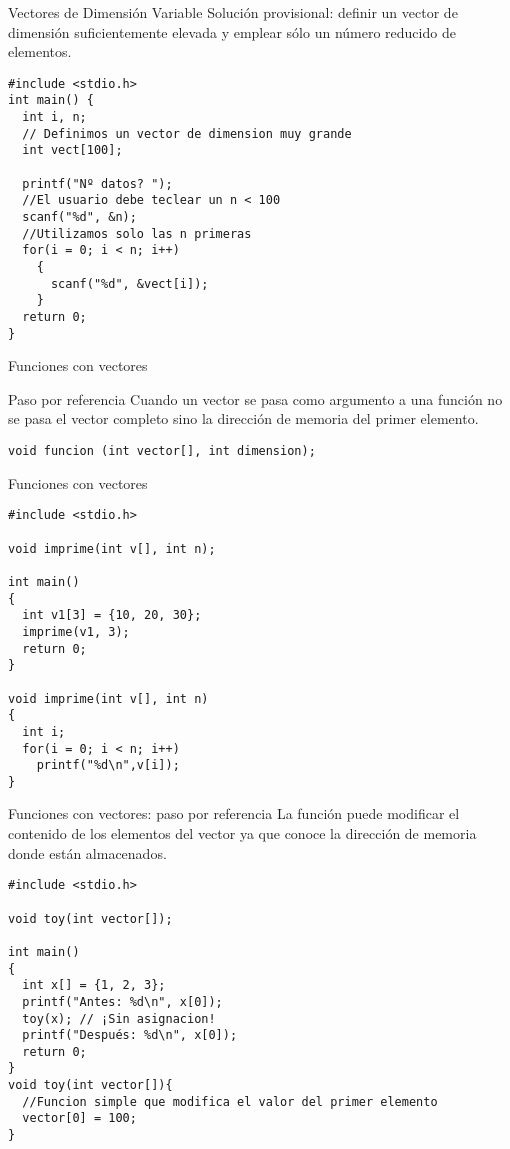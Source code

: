 \documentclass[xcolor={usenames,svgnames,dvipsnames}, aspectratio=169]{beamer}
\begin{document}
\begin{frame}[label={sec:orgffeb8ed},fragile]{Vectores de Dimensión Variable}
 \alert{Solución provisional}: definir un vector de dimensión suficientemente elevada y emplear sólo un número reducido de elementos.
\lstset{language=C,label= ,caption= ,captionpos=b,numbers=none}
\begin{lstlisting}
#include <stdio.h>
int main() {
  int i, n;
  // Definimos un vector de dimension muy grande
  int vect[100];

  printf("Nº datos? ");
  //El usuario debe teclear un n < 100
  scanf("%d", &n); 
  //Utilizamos solo las n primeras
  for(i = 0; i < n; i++) 
    {
      scanf("%d", &vect[i]);
    }
  return 0;
}
\end{lstlisting}
\end{frame}
\begin{frame}[label={sec:orgbdd855d},fragile]{Funciones con vectores}
 \begin{block}{Paso por referencia}
Cuando un vector se pasa como argumento a una función \alert{no se pasa el vector completo} sino la \alert{dirección de memoria del primer elemento}.
\lstset{language=C,label= ,caption= ,captionpos=b,numbers=none}
\begin{lstlisting}
void funcion (int vector[], int dimension);
\end{lstlisting}
\end{block}
\end{frame}

\begin{frame}[label={sec:org48dec1e},fragile]{Funciones con vectores}
 \lstset{language=C,label= ,caption= ,captionpos=b,numbers=none}
\begin{lstlisting}
#include <stdio.h>

void imprime(int v[], int n);

int main()
{
  int v1[3] = {10, 20, 30};
  imprime(v1, 3);
  return 0;
} 

void imprime(int v[], int n)
{
  int i;
  for(i = 0; i < n; i++)
    printf("%d\n",v[i]);
}
\end{lstlisting}
\end{frame}

\begin{frame}[label={sec:org0163707},fragile,plain]{Funciones con vectores: paso por referencia}
 La función \alert{puede modificar} el contenido de los elementos del vector ya que conoce la dirección de memoria donde están almacenados.

\lstset{language=C,label= ,caption= ,captionpos=b,numbers=none}
\begin{lstlisting}
#include <stdio.h>

void toy(int vector[]);

int main()
{
  int x[] = {1, 2, 3};
  printf("Antes: %d\n", x[0]);
  toy(x); // ¡Sin asignacion!
  printf("Después: %d\n", x[0]);
  return 0;
}
void toy(int vector[]){ 
  //Funcion simple que modifica el valor del primer elemento
  vector[0] = 100;
}
\end{lstlisting}
\end{frame}
\end{document}
